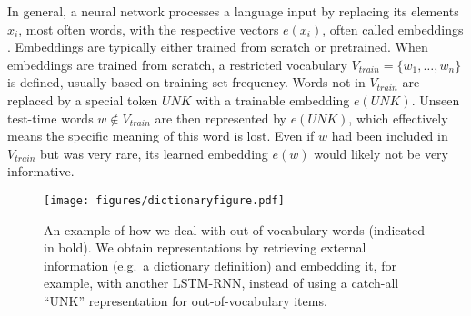 In general, a neural network processes a language input by replacing its elements $x_i$, most often words, with the respective vectors $e(x_i)$, often called embeddings \citep{bengio2003neural}. Embeddings are typically either trained from scratch or pretrained. When embeddings are trained from scratch, a restricted vocabulary $V_{train}=\{w_1,\ldots,w_{n}\}$ is defined, usually based on training set frequency.
Words not in $V_{train}$ are replaced by a special token $\mathit{UNK}$ with a trainable embedding $e(\mathit{UNK})$. Unseen test-time words $w \notin V_{train}$ are then represented by $e(\mathit{UNK})$, which effectively means the specific meaning of this word is lost. Even if $w$ had been included in $V_{train}$ but was very rare, its learned embedding $e(w)$ would likely not be very informative.
\begin{figure}
% 
% 
% 
\centering
\texttt{[image: figures/dictionaryfigure.pdf]}
\caption{\label{fig:dictionaryembed}An example of how we deal with out-of-vocabulary words (indicated in bold). We obtain representations by retrieving external information (e.g.~a dictionary definition) and embedding it, for example, with another LSTM-RNN, instead of using a catch-all ``UNK'' representation for out-of-vocabulary items.}
\end{figure}

